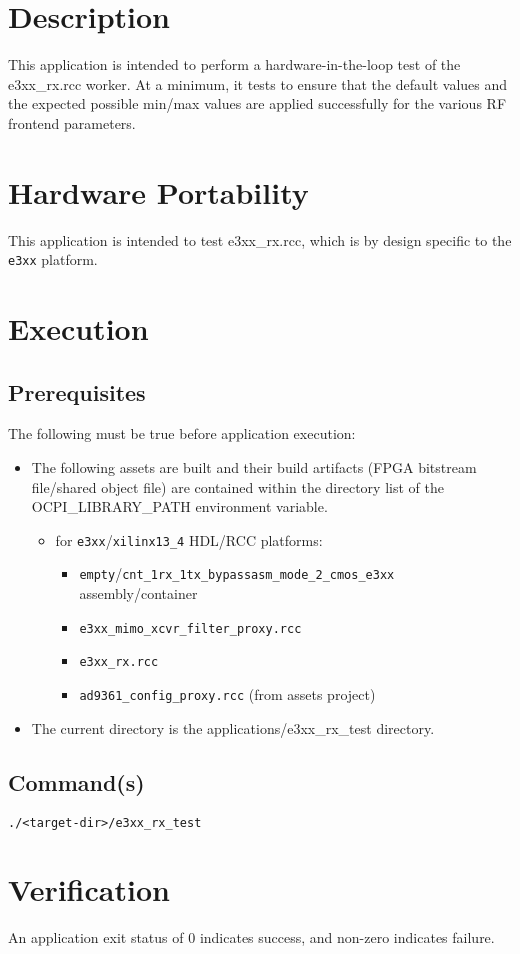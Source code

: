 \section{Description}
This application is intended to perform a hardware-in-the-loop test of the e3xx\_rx.rcc worker. At a minimum, it tests to ensure that the default values and the expected possible min/max values are applied successfully for the various RF frontend parameters.

\section{Hardware Portability}
This application is intended to test e3xx\_rx.rcc, which is by design specific to the \verb+e3xx+ platform.

\section{Execution}
\subsection{Prerequisites}
The following must be true before application execution:
\begin{itemize}
  \item The following assets are built and their build artifacts (FPGA bitstream file/shared object file) are contained within the directory list of the OCPI\_LIBRARY\_PATH environment variable.
  \begin{itemize}
    \item for \verb+e3xx+/\verb+xilinx13_4+ HDL/RCC platforms:
    \begin{itemize}
      \item \verb+empty+/\verb+cnt_1rx_1tx_bypassasm_mode_2_cmos_e3xx+ assembly/container
      \item \verb+e3xx_mimo_xcvr_filter_proxy.rcc+
      \item \verb+e3xx_rx.rcc+
      \item \verb+ad9361_config_proxy.rcc+ (from assets project)
    \end{itemize}
  \end{itemize}
\item The current directory is the applications/e3xx\_rx\_test directory.
\end{itemize}
\subsection{Command(s)}
\begin{lstlisting}
./<target-dir>/e3xx_rx_test
\end{lstlisting}
\section{Verification}
An application exit status of 0 indicates success, and non-zero indicates failure.




